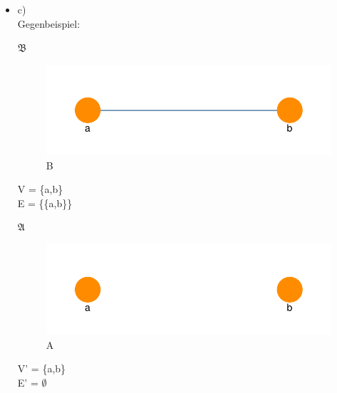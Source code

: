 \documentclass[a4paper]{scrartcl}
\begin{document}
\begin{itemize}
        \item c)\\
            Gegenbeispiel:\\
            \begin{minipage}[t]{0.45\textwidth}
                \begin{centering}
                    $\mathfrak{B}$\\
                    \begin{figure}[H]
                        \centering
                        \includegraphics[scale=0.3]{./4-c-drawing-B.pdf}
                        \caption{B}
                        \label{fig:}
                    \end{figure}
                    V = \{a,b\}\\
                    E = \{\{a,b\}\}\\
                \end{centering}
            \end{minipage}  
            \begin{minipage}[t]{0.45\textwidth}
                \begin{centering}
                    $\mathfrak{A}$\\
                    \begin{figure}[H]
                        \centering
                        \includegraphics[scale=0.3]{./4-c-drawing-A.pdf}
                        \caption{A}
                        \label{fig:}
                    \end{figure}
                    V' = \{a,b\}\\
                    E' = $\emptyset$\\
                \end{centering}
            \end{minipage}  


\end{itemize}
\end{document}
